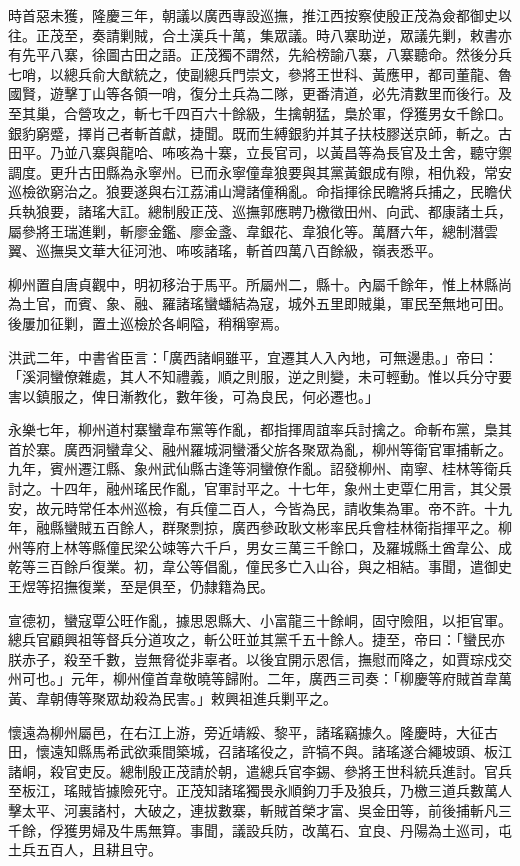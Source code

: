\begin{pinyinscope}
時首惡未獲，隆慶三年，朝議以廣西專設巡撫，推江西按察使殷正茂為僉都御史以往。正茂至，奏請剿賊，合土漢兵十萬，集眾議。時八寨助逆，眾議先剿，敕書亦有先平八寨，徐圖古田之語。正茂獨不謂然，先給榜諭八寨，八寨聽命。然後分兵七哨，以總兵俞大猷統之，使副總兵門崇文，參將王世科、黃應甲，都司董龍、魯國賢，遊擊丁山等各領一哨，復分土兵為二隊，更番清道，必先清數里而後行。及至其巢，合營攻之，斬七千四百六十餘級，生擒朝猛，梟於軍，俘獲男女千餘口。銀豹窮蹙，擇肖己者斬首獻，捷聞。既而生縛銀豹并其子扶枝膠送京師，斬之。古田平。乃並八寨與龍哈、咘咳為十寨，立長官司，以黃昌等為長官及土舍，聽守禦調度。更升古田縣為永寧州。已而永寧僮韋狼要與其黨黃銀成有隙，相仇殺，常安巡檢欲窮治之。狼要遂與右江荔浦山灣諸僮稱亂。命指揮徐民瞻將兵捕之，民瞻伏兵執狼要，諸瑤大訌。總制殷正茂、巡撫郭應聘乃檄徵田州、向武、都康諸土兵，屬參將王瑞進剿，斬廖金鑑、廖金盞、韋銀花、韋狼化等。萬曆六年，總制潛雲翼、巡撫吳文華大征河池、咘咳諸瑤，斬首四萬八百餘級，嶺表悉平。

柳州置自唐貞觀中，明初移治于馬平。所屬州二，縣十。內屬千餘年，惟上林縣尚為土官，而賓、象、融、羅諸瑤蠻蟠結為寇，城外五里即賊巢，軍民至無地可田。後屢加征剿，置土巡檢於各峒隘，稍稱寧焉。

洪武二年，中書省臣言：「廣西諸峒雖平，宜遷其人入內地，可無邊患。」帝曰：「溪洞蠻僚雜處，其人不知禮義，順之則服，逆之則變，未可輕動。惟以兵分守要害以鎮服之，俾日漸教化，數年後，可為良民，何必遷也。」

永樂七年，柳州道村寨蠻韋布黨等作亂，都指揮周誼率兵討擒之。命斬布黨，梟其首於寨。廣西洞蠻韋父、融州羅城洞蠻潘父旂各聚眾為亂，柳州等衛官軍捕斬之。九年，賓州遷江縣、象州武仙縣古逢等洞蠻僚作亂。詔發柳州、南寧、桂林等衛兵討之。十四年，融州瑤民作亂，官軍討平之。十七年，象州土吏覃仁用言，其父景安，故元時常任本州巡檢，有兵僮二百人，今皆為民，請收集為軍。帝不許。十九年，融縣蠻賊五百餘人，群聚剽掠，廣西參政耿文彬率民兵會桂林衛指揮平之。柳州等府上林等縣僮民梁公竦等六千戶，男女三萬三千餘口，及羅城縣土酋韋公、成乾等三百餘戶復業。初，韋公等倡亂，僮民多亡入山谷，與之相結。事聞，遣御史王煜等招撫復業，至是俱至，仍隸籍為民。

宣德初，蠻寇覃公旺作亂，據思恩縣大、小富龍三十餘峒，固守險阻，以拒官軍。總兵官顧興祖等督兵分道攻之，斬公旺並其黨千五十餘人。捷至，帝曰：「蠻民亦朕赤子，殺至千數，豈無脅從非辜者。以後宜開示恩信，撫慰而降之，如賈琮戍交州可也。」元年，柳州僮首韋敬曉等歸附。二年，廣西三司奏：「柳慶等府賊首韋萬黃、韋朝傳等聚眾劫殺為民害。」敕興祖進兵剿平之。

懷遠為柳州屬邑，在右江上游，旁近靖綏、黎平，諸瑤竊據久。隆慶時，大征古田，懷遠知縣馬希武欲乘間築城，召諸瑤役之，許犒不與。諸瑤遂合繩坡頭、板江諸峒，殺官吏反。總制殷正茂請於朝，遣總兵官李錫、參將王世科統兵進討。官兵至板江，瑤賊皆據險死守。正茂知諸瑤獨畏永順鉤刀手及狼兵，乃檄三道兵數萬人擊太平、河裏諸村，大破之，連拔數寨，斬賊首榮才富、吳金田等，前後捕斬凡三千餘，俘獲男婦及牛馬無算。事聞，議設兵防，改萬石、宜良、丹陽為土巡司，屯土兵五百人，且耕且守。


\end{pinyinscope}
